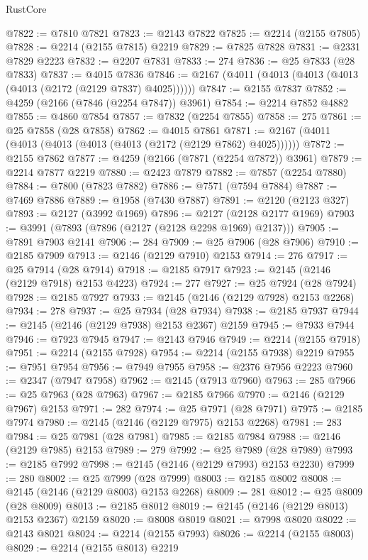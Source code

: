 \begin{lexlean}{RustCore}
\begin{coremodule}
@7822 := @7810 @7821
@7823 := @2143 @7822
@7825 := @2214 (@2155 @7805)
@7828 := @2214 (@2155 @7815) @2219
@7829 := @7825 @7828
@7831 := @2331 @7829 @2223
@7832 := @2207 @7831
@7833 := 274
@7836 := @25 @7833 (@28 @7833)
@7837 := @4015 @7836
@7846 := @2167 (@4011 (@4013 (@4013 (@4013 (@4013 (@2172 (@2129 @7837) @4025))))))
@7847 := @2155 @7837
@7852 := @4259 (@2166 (@7846 (@2254 @7847)) @3961)
@7854 := @2214 @7852 @4882
@7855 := @4860 @7854
@7857 := @7832 (@2254 @7855)
@7858 := 275
@7861 := @25 @7858 (@28 @7858)
@7862 := @4015 @7861
@7871 := @2167 (@4011 (@4013 (@4013 (@4013 (@4013 (@2172 (@2129 @7862) @4025))))))
@7872 := @2155 @7862
@7877 := @4259 (@2166 (@7871 (@2254 @7872)) @3961)
@7879 := @2214 @7877 @2219
@7880 := @2423 @7879
@7882 := @7857 (@2254 @7880)
@7884 := @7800 (@7823 @7882)
@7886 := @7571 (@7594 @7884)
@7887 := @7469 @7886
@7889 := @1958 (@7430 @7887)
@7891 := @2120 (@2123 @327)
@7893 := @2127 (@3992 @1969)
@7896 := @2127 (@2128 @2177 @1969)
@7903 := @3991 (@7893 (@7896 (@2127 (@2128 @2298 @1969) @2137)))
@7905 := @7891 @7903 @2141
@7906 := 284
@7909 := @25 @7906 (@28 @7906)
@7910 := @2185 @7909
@7913 := @2146 (@2129 @7910) @2153
@7914 := 276
@7917 := @25 @7914 (@28 @7914)
@7918 := @2185 @7917
@7923 := @2145 (@2146 (@2129 @7918) @2153 @4223)
@7924 := 277
@7927 := @25 @7924 (@28 @7924)
@7928 := @2185 @7927
@7933 := @2145 (@2146 (@2129 @7928) @2153 @2268)
@7934 := 278
@7937 := @25 @7934 (@28 @7934)
@7938 := @2185 @7937
@7944 := @2145 (@2146 (@2129 @7938) @2153 @2367) @2159
@7945 := @7933 @7944
@7946 := @7923 @7945
@7947 := @2143 @7946
@7949 := @2214 (@2155 @7918)
@7951 := @2214 (@2155 @7928)
@7954 := @2214 (@2155 @7938) @2219
@7955 := @7951 @7954
@7956 := @7949 @7955
@7958 := @2376 @7956 @2223
@7960 := @2347 (@7947 @7958)
@7962 := @2145 (@7913 @7960)
@7963 := 285
@7966 := @25 @7963 (@28 @7963)
@7967 := @2185 @7966
@7970 := @2146 (@2129 @7967) @2153
@7971 := 282
@7974 := @25 @7971 (@28 @7971)
@7975 := @2185 @7974
@7980 := @2145 (@2146 (@2129 @7975) @2153 @2268)
@7981 := 283
@7984 := @25 @7981 (@28 @7981)
@7985 := @2185 @7984
@7988 := @2146 (@2129 @7985) @2153
@7989 := 279
@7992 := @25 @7989 (@28 @7989)
@7993 := @2185 @7992
@7998 := @2145 (@2146 (@2129 @7993) @2153 @2230)
@7999 := 280
@8002 := @25 @7999 (@28 @7999)
@8003 := @2185 @8002
@8008 := @2145 (@2146 (@2129 @8003) @2153 @2268)
@8009 := 281
@8012 := @25 @8009 (@28 @8009)
@8013 := @2185 @8012
@8019 := @2145 (@2146 (@2129 @8013) @2153 @2367) @2159
@8020 := @8008 @8019
@8021 := @7998 @8020
@8022 := @2143 @8021
@8024 := @2214 (@2155 @7993)
@8026 := @2214 (@2155 @8003)
@8029 := @2214 (@2155 @8013) @2219

\end{coremodule}
\end{lexlean}
